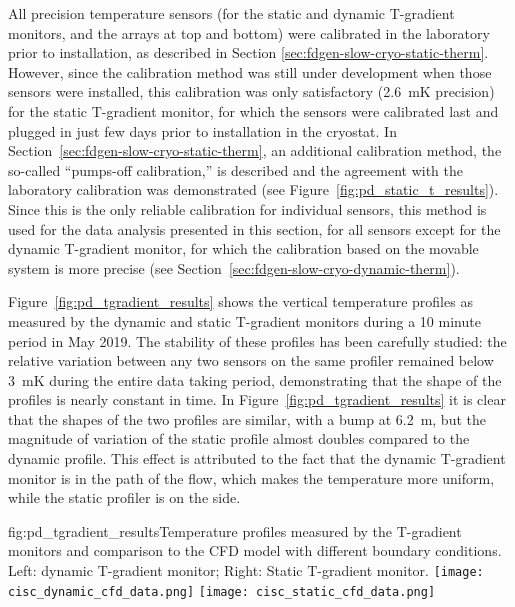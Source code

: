 All precision temperature sensors (for the static and dynamic T-gradient monitors,  and the \twod arrays at top and bottom) were calibrated in the laboratory prior to installation, as described in Section \ref{sec:fdgen-slow-cryo-static-therm}.
However, since the calibration method was still under development when those sensors 
were installed, this calibration was only satisfactory (\SI{2.6}{mK} precision) for the static T-gradient monitor, for which the sensors were calibrated last and  plugged in just few days prior to installation in the cryostat. 
In Section~\ref{sec:fdgen-slow-cryo-static-therm}, an additional calibration method, the so-called ``pumps-off calibration,'' is described and the agreement with the laboratory calibration was demonstrated %
(see Figure~\ref{fig:pd_static_t_results}). Since this is the only reliable calibration for individual sensors, this method is used for the data analysis presented in this section, for all sensors except for the dynamic T-gradient monitor, for which the calibration based on the movable system is more precise (see Section~\ref{sec:fdgen-slow-cryo-dynamic-therm}). 

Figure~\ref{fig:pd_tgradient_results} shows the vertical temperature profiles as measured by the dynamic and static T-gradient monitors during a 10 minute period in May 2019. The stability of these profiles has been carefully studied: the relative variation between any two sensors on the same profiler remained below \SI{3}{mK} during the entire data taking period, demonstrating that the shape of the profiles is nearly constant in time. In Figure~\ref{fig:pd_tgradient_results} it is clear  %
that the shapes of the two profiles are similar, with a bump at \SI{6.2}{m}, but the magnitude of %
variation of the static profile almost doubles %
compared to the dynamic profile. This effect is attributed to the fact that the dynamic T-gradient monitor is in the path of the \lar flow, which makes the temperature more uniform, while the static profiler is on the side. 

\begin{dunefigure}{fig:pd_tgradient_results}{Temperature profiles measured by the T-gradient monitors and comparison to the CFD model with different boundary conditions. Left: dynamic T-gradient monitor; Right: Static T-gradient monitor.}
  \texttt{[image: cisc\_dynamic\_cfd\_data.png]}%
  \texttt{[image: cisc\_static\_cfd\_data.png]}%
\end{dunefigure}

